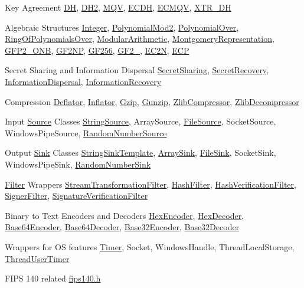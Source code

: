 \begin{DoxyDescription}
\item[Key Agreement]\hyperlink{dh_8h_ad6400f70a2f740693b62d66d59171a32}{DH}, \hyperlink{class_d_h2}{DH2}, \hyperlink{mqv_8h_a55efec2ab777263bc0d165afa0c3fe3b}{MQV}, \hyperlink{struct_e_c_d_h}{ECDH}, \hyperlink{struct_e_c_m_q_v}{ECMQV}, \hyperlink{class_x_t_r___d_h}{XTR\_\-DH} 
\item[Algebraic Structures]\hyperlink{class_integer}{Integer}, \hyperlink{class_polynomial_mod2}{PolynomialMod2}, \hyperlink{class_polynomial_over}{PolynomialOver}, \hyperlink{class_ring_of_polynomials_over}{RingOfPolynomialsOver}, \hyperlink{class_modular_arithmetic}{ModularArithmetic}, \hyperlink{class_montgomery_representation}{MontgomeryRepresentation}, \hyperlink{class_g_f_p2___o_n_b}{GFP2\_\-ONB}, \hyperlink{class_g_f2_n_p}{GF2NP}, \hyperlink{class_g_f256}{GF256}, \hyperlink{class_g_f2__32}{GF2\_}, \hyperlink{class_e_c2_n}{EC2N}, \hyperlink{class_e_c_p}{ECP} 
\item[Secret Sharing and Information Dispersal]\hyperlink{class_secret_sharing}{SecretSharing}, \hyperlink{class_secret_recovery}{SecretRecovery}, \hyperlink{class_information_dispersal}{InformationDispersal}, \hyperlink{class_information_recovery}{InformationRecovery} 
\item[Compression]\hyperlink{class_deflator}{Deflator}, \hyperlink{class_inflator}{Inflator}, \hyperlink{class_gzip}{Gzip}, \hyperlink{class_gunzip}{Gunzip}, \hyperlink{class_zlib_compressor}{ZlibCompressor}, \hyperlink{class_zlib_decompressor}{ZlibDecompressor} 
\item[Input \hyperlink{class_source}{Source} Classes]\hyperlink{class_string_source}{StringSource}, ArraySource, \hyperlink{class_file_source}{FileSource}, SocketSource, WindowsPipeSource, \hyperlink{class_random_number_source}{RandomNumberSource} 
\item[Output \hyperlink{class_sink}{Sink} Classes]\hyperlink{class_string_sink_template}{StringSinkTemplate}, \hyperlink{class_array_sink}{ArraySink}, \hyperlink{class_file_sink}{FileSink}, SocketSink, WindowsPipeSink, \hyperlink{class_random_number_sink}{RandomNumberSink} 
\item[\hyperlink{class_filter}{Filter} Wrappers]\hyperlink{class_stream_transformation_filter}{StreamTransformationFilter}, \hyperlink{class_hash_filter}{HashFilter}, \hyperlink{class_hash_verification_filter}{HashVerificationFilter}, \hyperlink{class_signer_filter}{SignerFilter}, \hyperlink{class_signature_verification_filter}{SignatureVerificationFilter} 
\item[Binary to Text Encoders and Decoders]\hyperlink{class_hex_encoder}{HexEncoder}, \hyperlink{class_hex_decoder}{HexDecoder}, \hyperlink{class_base64_encoder}{Base64Encoder}, \hyperlink{class_base64_decoder}{Base64Decoder}, \hyperlink{class_base32_encoder}{Base32Encoder}, \hyperlink{class_base32_decoder}{Base32Decoder} 
\item[Wrappers for OS features]\hyperlink{class_timer}{Timer}, Socket, WindowsHandle, ThreadLocalStorage, \hyperlink{class_thread_user_timer}{ThreadUserTimer} 
\item[FIPS 140 related]\hyperlink{fips140_8h}{fips140.h} 
\end{DoxyDescription}

